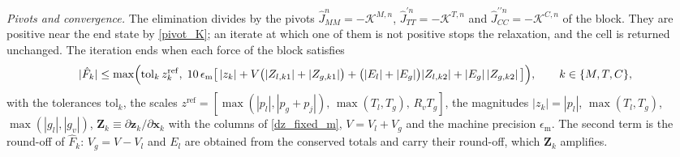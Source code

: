 \emph{Pivots and convergence.} The elimination divides by the pivots $\hat{J}^n_{MM}=-\mathcal{K}^{M,n}$, $\hat{J}^{\prime n}_{TT}=-\mathcal{K}^{T,n}$ and $\hat{J}^{\prime\prime n}_{CC}=-\mathcal{K}^{C,n}$ of the block. They are positive near the end state by \eqref{pivot_K}; an iterate at which one of them is not positive stops the relaxation, and the cell is returned unchanged. The iteration ends when each force of the block satisfies
\begin{equation}\label{conv_tol}
|\hat{F}_k|\le\max\Bigl(\mathrm{tol}_k\,z_k^{\mathrm{ref}},\;10\,\epsilon_{\mathrm{m}}\bigl[\,|z_k|+V\bigl(|Z_{l,k1}|+|Z_{g,k1}|\bigr)+\bigl(|E_l|+|E_g|\bigr)|Z_{l,k2}|+|E_g|\,|Z_{g,k2}|\,\bigr]\Bigr),\qquad k\in\{M,T,C\},
\end{equation}
with the tolerances $\mathrm{tol}_k$, the scales $z^{\mathrm{ref}}=[\max(|p_l|,|p_g+p_{j}|),\,\max(T_l,T_g),\,R_vT_g]$, the magnitudes $|z_k|=|p_l|$, $\max(T_l,T_g)$, $\max(|g_l|,|g_v|)$, $\boldsymbol{Z}_k\equiv\partial\boldsymbol{z}_k/\partial\boldsymbol{x}_k$ with the columns of \eqref{dz_fixed_m}, $V=V_l+V_g$ and the machine precision $\epsilon_{\mathrm{m}}$. The second term is the round-off of $\hat{F}_k$: $V_g=V-V_l$ and $E_l$ are obtained from the conserved totals and carry their round-off, which $\boldsymbol{Z}_k$ amplifies.

